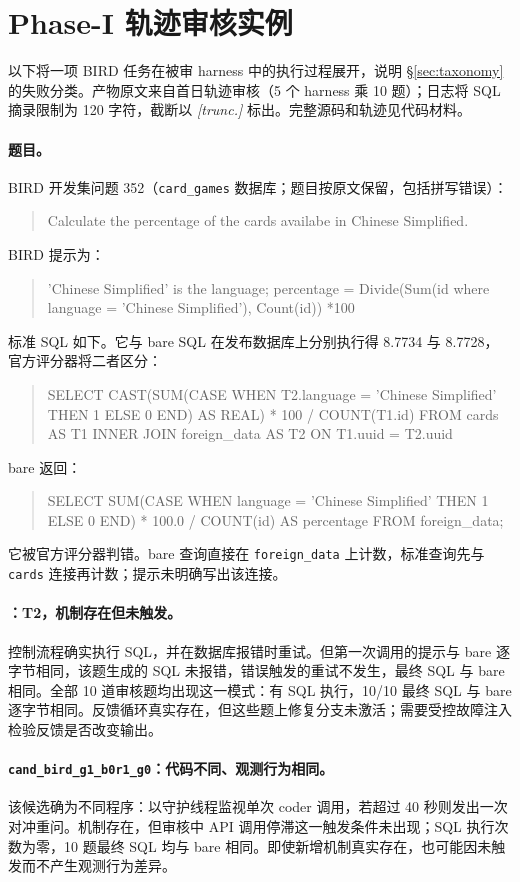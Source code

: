 \section{Phase-I 轨迹审核实例}\label{app:examples}
以下将一项 BIRD 任务在被审 harness 中的执行过程展开，说明 \S\ref{sec:taxonomy} 的失败分类。产物原文来自首日轨迹审核（5 个 harness 乘 10 题）；日志将 SQL 摘录限制为 120 字符，截断以 \emph{[trunc.]} 标出。完整源码和轨迹见代码材料。
\paragraph{题目。}BIRD 开发集问题 352（\texttt{card\_games} 数据库；题目按原文保留，包括拼写错误）：
\begin{quote}\small\ttfamily
Calculate the percentage of the cards availabe in Chinese Simplified.
\end{quote}
BIRD 提示为：
\begin{quote}\small\ttfamily
'Chinese Simplified' is the language; percentage = Divide(Sum(id where language = 'Chinese Simplified'), Count(id)) *100
\end{quote}
标准 SQL 如下。它与 bare SQL 在发布数据库上分别执行得 8.7734 与 8.7728，官方评分器将二者区分：
\begin{quote}\small\ttfamily
SELECT CAST(SUM(CASE WHEN T2.language = 'Chinese Simplified' THEN 1 ELSE 0 END) AS REAL) * 100 / COUNT(T1.id) FROM cards AS T1 INNER JOIN foreign\_data AS T2 ON T1.uuid = T2.uuid
\end{quote}
bare 返回：
\begin{quote}\small\ttfamily
SELECT SUM(CASE WHEN language = 'Chinese Simplified' THEN 1 ELSE 0 END) * 100.0 / COUNT(id) AS percentage FROM foreign\_data;
\end{quote}
它被官方评分器判错。bare 查询直接在 \texttt{foreign\_data} 上计数，标准查询先与 \texttt{cards} 连接再计数；提示未明确写出该连接。
\paragraph{\react{}：T2，机制存在但未触发。}控制流程确实执行 SQL，并在数据库报错时重试。但第一次调用的提示与 bare 逐字节相同，该题生成的 SQL 未报错，错误触发的重试不发生，最终 SQL 与 bare 相同。全部 10 道审核题均出现这一模式：有 SQL 执行，10/10 最终 SQL 与 bare 逐字节相同。反馈循环真实存在，但这些题上修复分支未激活；需要受控故障注入检验反馈是否改变输出。
\paragraph{\texttt{cand\_bird\_g1\_b0r1\_g0}：代码不同、观测行为相同。}该候选确为不同程序：以守护线程监视单次 coder 调用，若超过 40 秒则发出一次对冲重问。机制存在，但审核中 API 调用停滞这一触发条件未出现；SQL 执行次数为零，10 题最终 SQL 均与 bare 相同。即使新增机制真实存在，也可能因未触发而不产生观测行为差异。
